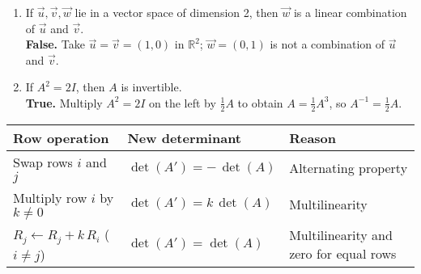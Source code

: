 \documentclass{article}
\begin{document}
\begin{multicols*}{2}
\begin{enumerate}[label=(\alph*)]
    \item If $\vec u,\vec v,\vec w$ lie in a vector space of dimension 2, then $\vec w$ is a linear combination of $\vec u$ and $\vec v$.\\
    \textbf{False.}  Take $\vec u=\vec v=(1,0)$ in $\mathbb R^{2}$; $\vec w=(0,1)$ is not a combination of $\vec u$ and $\vec v$.
    
    \item If $A^{2}=2I$, then $A$ is invertible.\\
    \textbf{True.}  Multiply $A^{2}=2I$ on the left by $\tfrac12A$ to obtain $A=\tfrac12A^{3}$, so $A^{-1}=\tfrac12A$.
    \end{enumerate}

\begin{tabular}{|l|l|l|}
    \hline
    \textbf{Row operation} & \textbf{New determinant} & \textbf{Reason} \\ \hline
    Swap rows $i$ and $j$        & $\det(A') = -\,\det(A)$ & Alternating property \\ \hline
    Multiply row $i$ by $k\neq 0$ & $\det(A') = k\,\det(A)$ & Multilinearity \\ \hline
    $R_j \gets R_j + k\,R_i$ ($i\neq j$) & $\det(A') = \det(A)$ & Multilinearity and zero for equal rows \\ \hline
    \end{tabular}
    
\end{multicols*}
\end{document}
